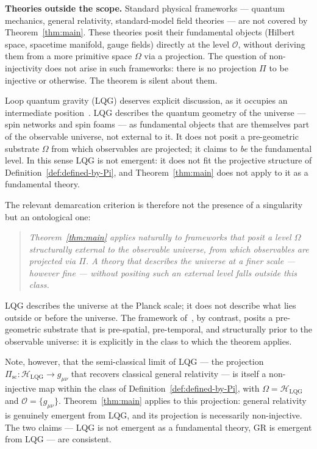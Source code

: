 \documentclass[12pt,a4paper]{article}
\begin{document}
  \textbf{Theories outside the scope.}
  Standard physical frameworks --- quantum mechanics, general relativity,
  standard-model field theories --- are not covered by Theorem~\ref{thm:main}.
  These theories posit their fundamental objects (Hilbert space, spacetime manifold,
  gauge fields) directly at the level $\mathcal{O}$, without deriving them from a
  more primitive space $\Omega$ via a projection.
  The question of non-injectivity does not arise in such frameworks: there is no
  projection $\Pi$ to be injective or otherwise.
  The theorem is silent about them.

  Loop quantum gravity (LQG) deserves explicit discussion, as it occupies an
  intermediate position~\citep{Rovelli2004,Thiemann2007}.
  LQG describes the quantum geometry of the universe --- spin networks and spin
  foams --- as fundamental objects that are themselves part of the observable
  universe, not external to it.
  It does not posit a pre-geometric substrate $\Omega$ from which observables
  are projected; it claims to \emph{be} the fundamental level.
  In this sense LQG is not emergent: it does not fit the projective structure
  of Definition~\ref{def:defined-by-Pi}, and Theorem~\ref{thm:main} does not
  apply to it as a fundamental theory.

  The relevant demarcation criterion is therefore not the presence of a
  singularity but an ontological one:
  \begin{quote}
    \emph{Theorem~\ref{thm:main} applies naturally to frameworks that posit
    a level $\Omega$ structurally external to the observable universe,
      from which observables are projected via $\Pi$.
      A theory that describes the universe at a finer scale --- however fine ---
      without positing such an external level falls outside this class.}
  \end{quote}
  LQG describes the universe at the Planck scale; it does not describe what
  lies outside or before the universe.
  The framework of~\citep{Cosmochrony}, by contrast, posits a pre-geometric substrate that is
  pre-spatial, pre-temporal, and structurally prior to the observable universe:
  it is explicitly in the class to which the theorem applies.

  Note, however, that the semi-classical limit of LQG ---
  the projection $\Pi_\mathrm{sc} : \mathcal{H}_\mathrm{LQG} \to g_{\mu\nu}$
  that recovers classical general relativity --- is itself a non-injective map
  within the class of Definition~\ref{def:defined-by-Pi}, with
  $\Omega = \mathcal{H}_\mathrm{LQG}$ and $\mathcal{O} = \{g_{\mu\nu}\}$.
  Theorem~\ref{thm:main} applies to this projection: general relativity is
  genuinely emergent from LQG, and its projection is necessarily non-injective.
  The two claims --- LQG is not emergent as a fundamental theory, GR is
  emergent from LQG --- are consistent.
\end{document}

